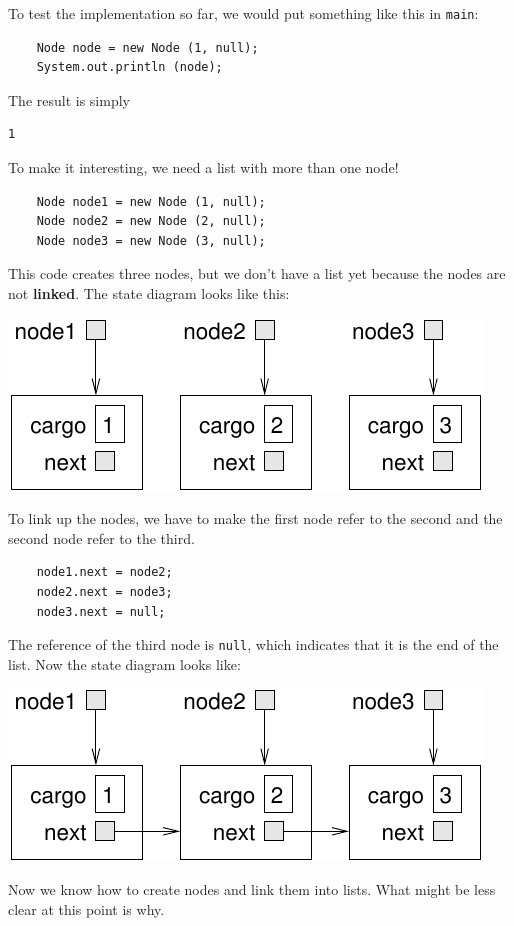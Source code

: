 \documentclass[12pt]{book}
\theoremstyle{exercise}
\begin{document}
To test the implementation so far, we would put something like
this in {\tt main}:

\begin{verbatim}
    Node node = new Node (1, null);
    System.out.println (node);
\end{verbatim}
%
The result is simply

\begin{verbatim}
1
\end{verbatim}
%
To make it interesting, we need a list with more than
one node!

\begin{verbatim}
    Node node1 = new Node (1, null);
    Node node2 = new Node (2, null);
    Node node3 = new Node (3, null);
\end{verbatim}
%
This code creates three nodes, but we don't have a list yet
because the nodes are not {\bf linked}.  The state diagram
looks like this:


\includegraphics{figs/list1.pdf}


To link up the nodes, we have to make the first node refer to the
second and the second node refer to the third.

\begin{verbatim}
    node1.next = node2;
    node2.next = node3;
    node3.next = null;
\end{verbatim}
%
The reference of the third node is {\tt null}, which indicates that
it is the end of the list.  Now the state diagram looks like:


\includegraphics{figs/list2.pdf}


Now we know how to create nodes and link them into lists.  What
might be less clear at this point is why.
\end{document}
